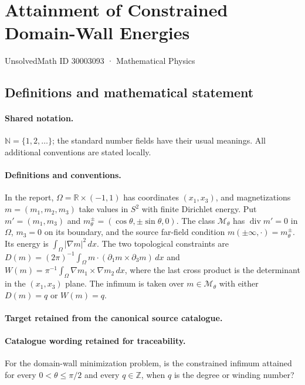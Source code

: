 \documentclass[11pt]{article}
\begin{document}
\setcounter{section}{30003092}
\section{Attainment of Constrained Domain-Wall Energies}\label{30003093}
{\small UnsolvedMath ID 30003093 · Mathematical Physics}
\subsection{Definitions and mathematical statement}

\paragraph{Shared notation.}$\mathbb N=\{1,2,\ldots\}$; the standard number fields have their usual meanings. All additional conventions are stated locally.


\paragraph{Definitions and conventions.}
In the report, $\Omega=\mathbb R\times(-1,1)$ has coordinates $(x_1,x_3)$, and magnetizations $m=(m_1,m_2,m_3)$ take values in $S^2$ with finite Dirichlet energy. Put $m'=(m_1,m_3)$ and $m_\theta^\pm=(\cos\theta,\pm\sin\theta,0)$. The class $\mathcal M_\theta$ has $\operatorname{div}m'=0$ in $\Omega$, $m_3=0$ on its boundary, and the source far-field condition $m(\pm\infty,\cdot)=m_\theta^\pm$. Its energy is $\int_\Omega|\nabla m|^2\,dx$. The two topological constraints are $D(m)=(2\pi)^{-1}\int_\Omega m\cdot(\partial_1m\times\partial_3m)\,dx$ and $W(m)=\pi^{-1}\int_\Omega\nabla m_1\times\nabla m_2\,dx$, where the last cross product is the determinant in the $(x_1,x_3)$ plane. The infimum is taken over $m\in\mathcal M_\theta$ with either $D(m)=q$ or $W(m)=q$.

\paragraph{Target retained from the canonical source catalogue.}
\paragraph{Catalogue wording retained for traceability.}
For the domain-wall minimization problem, is the constrained infimum attained for every $0<\theta\leq\pi/2$ and every $q\in\mathbb{Z}$, when $q$ is the degree or winding number?
\end{document}
